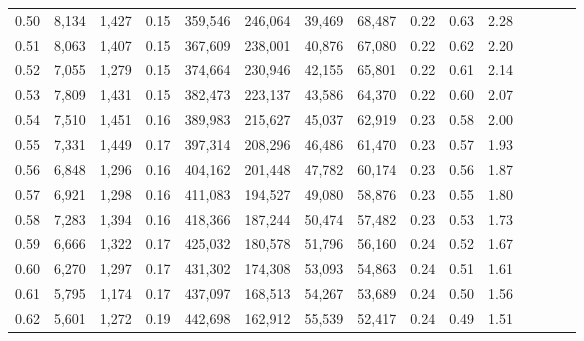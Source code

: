 \begin{tabular}{rrrcrrrrrrrrrrr}
0.50 &   8,134 &   1,427 &                                       0.15 &  359,546 &  246,064 &   39,469 &   68,487 &  0.22 &  0.63 &                         2.28 \\
0.51 &   8,063 &   1,407 &                                       0.15 &  367,609 &  238,001 &   40,876 &   67,080 &  0.22 &  0.62 &                         2.20 \\
0.52 &   7,055 &   1,279 &                                       0.15 &  374,664 &  230,946 &   42,155 &   65,801 &  0.22 &  0.61 &                         2.14 \\
0.53 &   7,809 &   1,431 &                                       0.15 &  382,473 &  223,137 &   43,586 &   64,370 &  0.22 &  0.60 &                         2.07 \\
0.54 &   7,510 &   1,451 &                                       0.16 &  389,983 &  215,627 &   45,037 &   62,919 &  0.23 &  0.58 &                         2.00 \\
0.55 &   7,331 &   1,449 &                                       0.17 &  397,314 &  208,296 &   46,486 &   61,470 &  0.23 &  0.57 &                         1.93 \\
0.56 &   6,848 &   1,296 &                                       0.16 &  404,162 &  201,448 &   47,782 &   60,174 &  0.23 &  0.56 &                         1.87 \\
0.57 &   6,921 &   1,298 &                                       0.16 &  411,083 &  194,527 &   49,080 &   58,876 &  0.23 &  0.55 &                         1.80 \\
0.58 &   7,283 &   1,394 &                                       0.16 &  418,366 &  187,244 &   50,474 &   57,482 &  0.23 &  0.53 &                         1.73 \\
0.59 &   6,666 &   1,322 &                                       0.17 &  425,032 &  180,578 &   51,796 &   56,160 &  0.24 &  0.52 &                         1.67 \\
0.60 &   6,270 &   1,297 &                                       0.17 &  431,302 &  174,308 &   53,093 &   54,863 &  0.24 &  0.51 &                         1.61 \\
0.61 &   5,795 &   1,174 &                                       0.17 &  437,097 &  168,513 &   54,267 &   53,689 &  0.24 &  0.50 &                         1.56 \\
0.62 &   5,601 &   1,272 &                                       0.19 &  442,698 &  162,912 &   55,539 &   52,417 &  0.24 &  0.49 &                         1.51 \\

\end{tabular}

